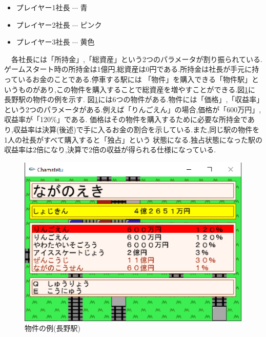 \documentclass[a4j]{jarticle}
\begin{document}
    \begin{itemize}
        \item プレイヤー1社長 $\cdots$ 青
        \item プレイヤー2社長 $\cdots$ ピンク
        \item プレイヤー3社長 $\cdots$ 黄色
      \end{itemize}
      　各社長には「所持金」,「総資産」という2つのパラメータが割り振られている.ゲームスタート時の所持金は1億円,総資産は0円である.所持金は社長が手元に持っているお金のことである.停車する駅には
      「物件」を購入できる「物件駅」というものがあり,この物件を購入することで総資産を増やすことができる.図\ref{bukkenex}に長野駅の物件の例を示す.
      図\ref{bukkenex}には6つの物件がある.物件には「価格」,「収益率」という2つのパラメータがある.例えば「りんごえん」の場合,価格が「600万円」,収益率が「120\%」である.
      価格はその物件を購入するために必要な所持金であり,収益率は決算(後述)で手に入るお金の割合を示している.また,同じ駅の物件を1人の社長がすべて購入すると「独占」という
      状態になる.独占状態になった駅の収益率は2倍になり,決算で2倍の収益が得られる仕様になっている.

      \begin{figure}[H]
        \centering
        \includegraphics[scale=1.5]{bukkenex.eps}
        \caption{物件の例(長野駅)}
         \label{bukkenex}
        \end{figure}
    
\end{document}
